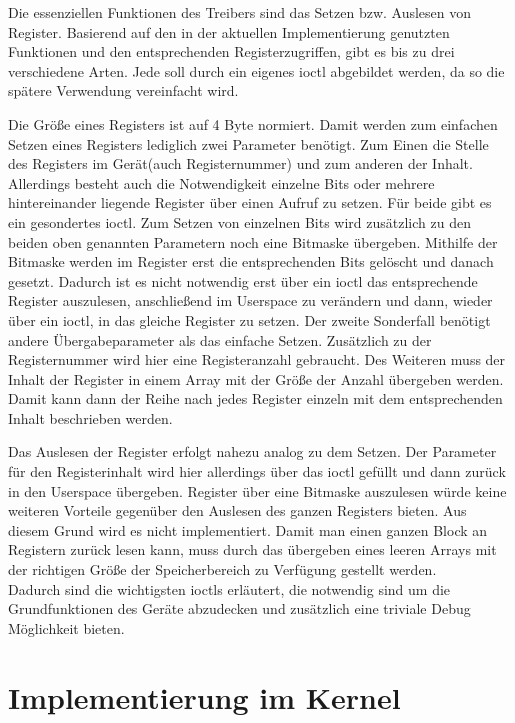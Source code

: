 Die essenziellen Funktionen des Treibers sind das Setzen bzw. Auslesen von Register. Basierend auf den in der aktuellen Implementierung genutzten Funktionen und den entsprechenden Registerzugriffen, gibt es bis zu drei verschiedene Arten. Jede soll durch ein eigenes \ac{ioctl} abgebildet werden, da so die spätere Verwendung vereinfacht wird.  


Die Größe eines Registers ist auf 4 Byte normiert. Damit werden zum einfachen Setzen eines Registers lediglich zwei Parameter benötigt. Zum Einen die Stelle des Registers im Gerät(auch Registernummer) und zum anderen der Inhalt. 
Allerdings besteht auch die Notwendigkeit einzelne Bits oder mehrere hintereinander liegende Register über einen Aufruf zu setzen. Für beide gibt es ein gesondertes \ac{ioctl}. Zum Setzen von einzelnen Bits wird zusätzlich zu den beiden oben genannten Parametern noch eine Bitmaske übergeben. Mithilfe der Bitmaske werden im Register erst die entsprechenden Bits gelöscht und danach gesetzt. Dadurch ist es nicht notwendig erst über ein \ac{ioctl} das entsprechende Register auszulesen, anschließend im Userspace zu verändern und dann, wieder über ein \ac{ioctl}, in das gleiche Register zu setzen.
Der zweite Sonderfall benötigt andere Übergabeparameter als das einfache Setzen. Zusätzlich zu der Registernummer wird hier eine Registeranzahl gebraucht. Des Weiteren muss der Inhalt der Register in einem Array mit der Größe der Anzahl übergeben werden. Damit kann dann der Reihe nach jedes Register einzeln mit dem entsprechenden Inhalt beschrieben werden.


Das Auslesen der Register erfolgt nahezu analog zu dem Setzen. Der Parameter für den Registerinhalt wird hier allerdings über das \ac{ioctl} gefüllt und dann zurück in den Userspace übergeben. 
Register über eine Bitmaske auszulesen würde keine weiteren Vorteile gegenüber den Auslesen des ganzen Registers bieten. Aus diesem Grund wird es nicht implementiert.  
Damit man einen ganzen Block an Registern zurück lesen kann, muss durch das übergeben eines leeren Arrays mit der richtigen Größe der Speicherbereich zu Verfügung gestellt werden.\\

Dadurch sind die wichtigsten \ac{ioctl}s erläutert, die notwendig sind um die Grundfunktionen des Geräte abzudecken und zusätzlich eine triviale Debug Möglichkeit bieten.

\section{Implementierung im Kernel}\label{sec:kernel}

